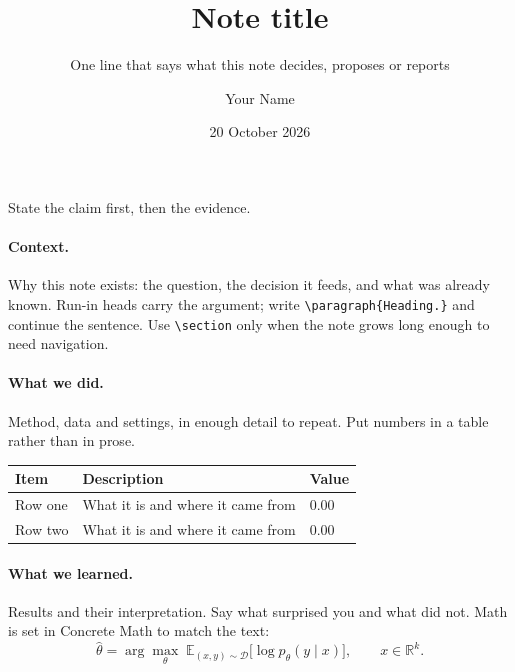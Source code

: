 \documentclass[note,internal]{trbdoc}
\title{Note title}
\subtitle{One line that says what this note decides, proposes or reports}
\author{Your Name}
\date{20 October 2026}
\newcommand{\E}{\mathbb E}
\newcommand{\R}{\mathbb R}
\begin{document}
\maketitle

State the claim first, then the evidence.\cite{example2026}

\paragraph{Context.}
Why this note exists: the question, the decision it feeds, and what was already known.
Run-in heads carry the argument; write \verb|\paragraph{Heading.}| and continue the
sentence. Use \verb|\section| only when the note grows long enough to need navigation.

\paragraph{What we did.}
Method, data and settings, in enough detail to repeat. Put numbers in a table rather
than in prose.

{\small
\renewcommand{\arraystretch}{1.12}
\begin{tabularx}{\linewidth}{@{}>{\raggedright\arraybackslash}p{3.2cm}X>{\raggedleft\arraybackslash}p{2cm}@{}}
\toprule
\textbf{Item} & \textbf{Description} & \textbf{Value}\\
\midrule
Row one & What it is and where it came from & \num{0.00}\\
Row two & What it is and where it came from & \num{0.00}\\
\bottomrule
\end{tabularx}}

\paragraph{What we learned.}
Results and their interpretation. Say what surprised you and what did not.
Math is set in Concrete Math to match the text:
\[
  \hat\theta = \arg\max_{\theta}\; \E_{(x,y)\sim\mathcal D}\bigl[\log p_\theta(y\mid x)\bigr],
  \qquad x\in\R^k.
\]
\end{document}
